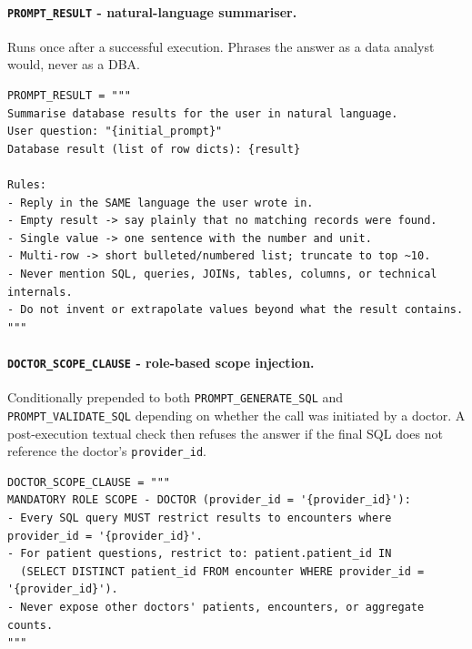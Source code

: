 \paragraph{\texttt{PROMPT\_\allowbreak RESULT} - natural-language summariser.} Runs once after a successful execution. Phrases the answer as a data analyst would, never as a DBA.

\begin{lstlisting}[style=pythonstyle]
PROMPT_RESULT = """
Summarise database results for the user in natural language.
User question: "{initial_prompt}"
Database result (list of row dicts): {result}

Rules:
- Reply in the SAME language the user wrote in.
- Empty result -> say plainly that no matching records were found.
- Single value -> one sentence with the number and unit.
- Multi-row -> short bulleted/numbered list; truncate to top ~10.
- Never mention SQL, queries, JOINs, tables, columns, or technical internals.
- Do not invent or extrapolate values beyond what the result contains.
"""
\end{lstlisting}

\paragraph{\texttt{DOCTOR\_\allowbreak SCOPE\_\allowbreak CLAUSE} - role-based scope injection.} Conditionally prepended to both \texttt{PROMPT\_\allowbreak GENERATE\_\allowbreak SQL} and \texttt{PROMPT\_\allowbreak VALIDATE\_\allowbreak SQL} depending on whether the call was initiated by a doctor. A post-execution textual check then refuses the answer if the final SQL does not reference the doctor's \texttt{provider\_id}.

\begin{lstlisting}[style=pythonstyle]
DOCTOR_SCOPE_CLAUSE = """
MANDATORY ROLE SCOPE - DOCTOR (provider_id = '{provider_id}'):
- Every SQL query MUST restrict results to encounters where provider_id = '{provider_id}'.
- For patient questions, restrict to: patient.patient_id IN
  (SELECT DISTINCT patient_id FROM encounter WHERE provider_id = '{provider_id}').
- Never expose other doctors' patients, encounters, or aggregate counts.
"""
\end{lstlisting}